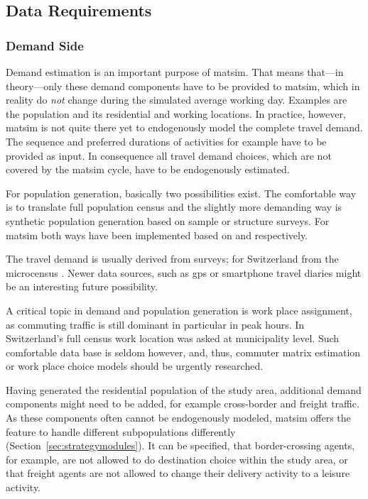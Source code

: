 \subsection{Data Requirements}
\subsubsection{Demand Side}
Demand estimation is 
an important purpose of \gls{matsim}. That means that---in theory---only these demand components have to be provided to \gls{matsim}, which in reality do \emph{not} change during the simulated average working day. Examples are the population and its residential and working locations. In practice, however, \gls{matsim} is not quite there yet to endogenously model the complete travel demand. The sequence and preferred durations of activities for example have to be provided as input. In consequence all travel demand choices, which are not covered by the \gls{matsim} cycle, have to be endogenously estimated. 

For population generation, basically two possibilities exist. The comfortable way is to translate full population census and the slightly more demanding way is synthetic population generation \citep[e.g.,][]{GuoBhat_TRR_2007} based on sample or structure surveys. For \gls{matsim} both ways have been implemented based on \citet[][]{BfS_VZ_2000} and \citet[][]{Mueller_unpub_STRC_2011} respectively.

The travel demand is usually derived from surveys; for Switzerland from the \gls{microcensus} \citep[][]{BfS-MZ2005_manual_2006}. Newer data sources, such as \gls{gps} or smartphone travel diaries might be an interesting future possibility.

A critical topic in demand and population generation is work place assignment, as commuting traffic is still dominant in particular in peak hours. In Switzerland's full census work location was asked at municipality level. Such comfortable data base is seldom however, and, thus, commuter matrix estimation or work place choice models should be urgently researched.

Having generated the residential population of the study area, additional demand components might need to be added, for example cross-border and freight traffic. As these components often cannot be endogenously modeled, \gls{matsim} offers the feature to handle different subpopulations differently (Section~\ref{sec:strategymodules}). It can be specified, that border-crossing agents, for example, are not allowed to do destination choice within the study area, or that freight agents are not allowed to change their delivery activity to a leisure activity.


